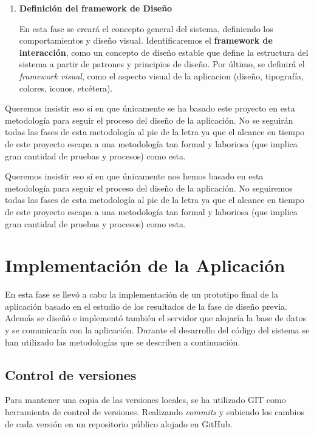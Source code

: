 \begin{enumerate}
\item \textbf{Definición del framework de Diseño}

En esta fase se creará el concepto general del sistema, definiendo los comportamientos y diseño visual. Identificaremos el \textbf{framework de interacción}, como un concepto de diseño estable que define la estructura del sistema a partir de patrones y principios de diseño. Por último, se definirá el \textit{framework visual}, como el aspecto visual de la aplicacion (diseño, tipografía, colores, iconos, etcétera).

\end{enumerate}

Queremos insistir eso sí en que únicamente se ha basado este proyecto en esta metodología para seguir el proceso del diseño de la aplicación. No se seguirán todas las fases de esta metodología al pie de la letra ya que el alcance en tiempo de este proyecto escapa a una metodología tan formal y laboriosa (que implica gran cantidad de pruebas y procesos) como esta.

Queremos insistir eso sí en que únicamente nos hemos basado en esta metodología para seguir el proceso del diseño de la aplicación. No seguiremos todas las fases de esta metodología al pie de la letra ya que el alcance en tiempo de este proyecto escapa a una metodología tan formal y laboriosa (que implica gran cantidad de pruebas y procesos) como esta.

\section{Implementación de la Aplicación}

En esta fase se llevó a cabo la implementación de un prototipo final de la aplicación basado en el estudio de los resultados de la fase de diseño previa. Además se diseñó e implementó también el servidor que alojaría la base de datos y se comunicaría con la aplicación. Durante el desarrollo del código del sistema se han utilizado las metodologías que se describen a continuación.

\subsection{Control de versiones}

Para mantener una copia de las versiones locales, se ha utilizado GIT como herramienta de control de versiones. Realizando \textit{commits} y subiendo los cambios de cada versión en un repositorio público alojado en GitHub.

